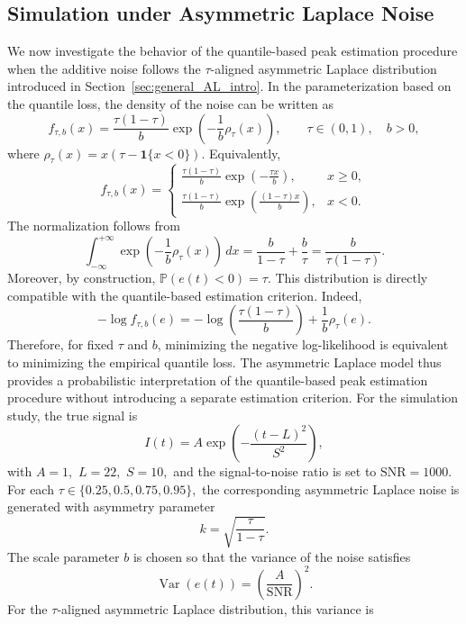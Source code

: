 \documentclass[12pt,a4paper]{article}
\begin{document}
	{\color{blue}
		\subsection{Simulation under Asymmetric Laplace Noise}
		\label{subsec:asymmetric_laplace_noise}
		
		We now investigate the behavior of the quantile-based peak estimation procedure when the additive noise follows the $\tau$-aligned asymmetric Laplace distribution introduced in Section~\ref{sec:general_AL_intro}. In the parameterization based on the quantile loss, the density of the noise can be written as
		\[
		f_{\tau,b}(x)
		=
		\frac{\tau(1-\tau)}{b}
		\exp\left(-\frac{1}{b}\rho_\tau(x)\right),
		\qquad
		\tau\in(0,1),\quad b>0,
		\]
		where
		\(
		\rho_\tau(x)=x\left(\tau-\mathbf{1}\{x<0\}\right).
		\)
		Equivalently,
		\[
		f_{\tau,b}(x)
		=
		\begin{cases}
			\displaystyle
			\frac{\tau(1-\tau)}{b}
			\exp\left(-\frac{\tau x}{b}\right), & x\geq 0, \\[8pt]
			\displaystyle
			\frac{\tau(1-\tau)}{b}
			\exp\left(\frac{(1-\tau)x}{b}\right), & x<0.
		\end{cases}
		\]
		The normalization follows from
		\[
		\int_{-\infty}^{+\infty}
		\exp\left(-\frac{1}{b}\rho_\tau(x)\right)\,dx
		=
		\frac{b}{1-\tau}+\frac{b}{\tau}
		=
		\frac{b}{\tau(1-\tau)}.
		\]
		Moreover, by construction,
		\(
		\mathbb{P}(e(t)<0)=\tau.
		\)
		This distribution is directly compatible with the quantile-based estimation criterion. Indeed,
		\[
		-\log f_{\tau,b}(e)
		=
		-\log\left(\frac{\tau(1-\tau)}{b}\right)
		+
		\frac{1}{b}\rho_\tau(e).
		\]
		Therefore, for fixed $\tau$ and $b$, minimizing the negative log-likelihood is equivalent to minimizing the empirical quantile loss. The asymmetric Laplace model thus provides a probabilistic interpretation of the quantile-based peak estimation procedure without introducing a separate estimation criterion.
		For the simulation study, the true signal is
		\[
		I(t)
		=
		A\exp\left(-\frac{(t-L)^2}{S^2}\right),
		\]
		with
		$A=1,$
		$L=22,$
		$S=10,$
		and the signal-to-noise ratio is set to
		\(
		\mathrm{SNR}=1000.
		\)
		For each
		\(
		\tau\in\{0.25,0.5,0.75,0.95\},
		\)
		the corresponding asymmetric Laplace noise is generated with asymmetry parameter
		\[
		k=\sqrt{\frac{\tau}{1-\tau}}.
		\]
		The scale parameter $b$ is chosen so that the variance of the noise satisfies
		\[
		\operatorname{Var}(e(t))
		=
		\left(\frac{A}{\mathrm{SNR}}\right)^2.
		\]
		For the $\tau$-aligned asymmetric Laplace distribution, this variance is
}
\end{document}
